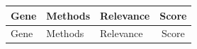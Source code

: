 \documentclass{article}
\begin{document}
\begin{longtable}{l l l c}
\toprule
Gene & Methods & Relevance & Score \\
\midrule
\endfirsthead
\toprule
Gene & Methods & Relevance & Score \\
\midrule
\endhead

\bottomrule
\end{longtable}
\end{document}
